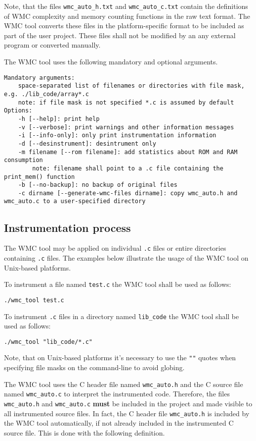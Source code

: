 Note, that the files \verb|wmc_auto_h.txt| and \verb|wmc_auto_c.txt| contain the definitions of WMC complexity and memory counting functions in the raw text format. The WMC tool converts these files in the platform-specific format to be included as part of the user project. These files shall not be modified by an any external program or converted manually.

The WMC tool uses the following mandatory and optional arguments.

\begin{Verbatim}[fontsize=\scriptsize]
Mandatory arguments:
    space-separated list of filenames or directories with file mask, e.g. ./lib_code/array*.c
    note: if file mask is not specified *.c is assumed by default
Options:
    -h [--help]: print help
    -v [--verbose]: print warnings and other information messages
    -i [--info-only]: only print instrumentation information
    -d [--desinstrument]: desintrument only
    -m filename [--rom filename]: add statistics about ROM and RAM consumption
        note: filename shall point to a .c file containing the print_mem() function
    -b [--no-backup]: no backup of original files
    -c dirname [--generate-wmc-files dirname]: copy wmc_auto.h and wmc_auto.c to a user-specified directory
\end{Verbatim}

\subsection{Instrumentation process}
\label{ch:instrumentation_process}

The WMC tool may be applied on individual \verb|.c| files or entire directories containing \verb|.c| files. The examples below illustrate the usage of the WMC tool on Unix-based platforms.

To instrument a file named \verb|test.c| the WMC tool shall be used as follows:

\verb|./wmc_tool test.c|

To instrument \verb|.c| files in a directory named \verb|lib_code| the WMC tool shall be used as follows:

\verb|./wmc_tool "lib_code/*.c"|

Note, that on Unix-based platforms it's necessary to use the \verb|""| quotes when specifying file masks on the command-line to avoid globing.

The WMC tool uses the C header file named \verb|wmc_auto.h| and the C source file named \verb|wmc_auto.c| to interpret the instrumented code. Therefore, the files \verb|wmc_auto.h| and \verb|wmc_auto.c| \textbf{must} be included in the project and made visible to all instrumented source files. In fact, the C header file \verb|wmc_auto.h| is included by the WMC tool automatically, if not already included in the instrumented C source file. This is done with the following definition.

